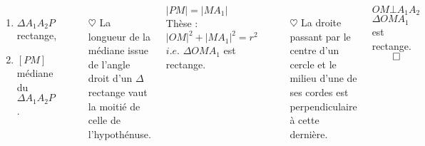 \documentclass[10pt]{beamer}
\begin{document}
{\begin{columns}[t]
		\begin{enumerate}
		 \item $\Delta A_1A_2P$ rectange,
		 \item $[PM]$ médiane du $\Delta A_1A_2P$. 
		\end{enumerate}
		
		\begin{itemize} 
		\item[$\heartsuit$]La longueur de la médiane issue de l'angle droit d'un $\Delta$ rectange vaut la moitié de celle de l'hypothénuse.
		\end{itemize}
		
		$|PM| = |MA_1|$ \\
		\medskip 
		\flushleft Thèse : $|OM|^2 + |MA_1|^2 = r^2$\\	\centering
		$i.e.$ $\Delta OMA_1$ est rectange. \\
		
		\begin{itemize} 
		\item[$\heartsuit$]La droite passant par le centre d'un cercle et le milieu d'une de ses cordes est perpendiculaire à cette dernière.
		\end{itemize}
		
		$OM \bot A_1A_2$ \\
		\medskip 
		\hfill $\Delta OMA_1$ est rectange. \hfill $\qed$

   
	   \end{columns}
	   }
	 
\end{document}
